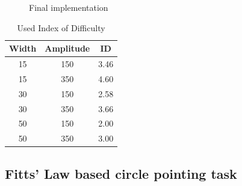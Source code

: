 \begin{figure}[h]
    \centering
    \qquad
    \caption{Final implementation}
    \label{fig:layout-final-implementation}
\end{figure}

\begin{table}
    \centering
    \begin{tabular}{c | c | c}
    \toprule
    Width & Amplitude & ID \\
    \midrule
    15  & 150   & 3.46 \\
    15  & 350   & 4.60 \\
    30 & 150 & 2.58 \\
    30 & 350 & 3.66 \\
    50 & 150 & 2.00 \\
    50 & 350 & 3.00
    \end{tabular}
    \caption{Used Index of Difficulty}
    \label{tab:id_values}
\end{table}

\subsection{Fitts' Law based circle pointing task}
\label{subsec:impl:circle_task}

